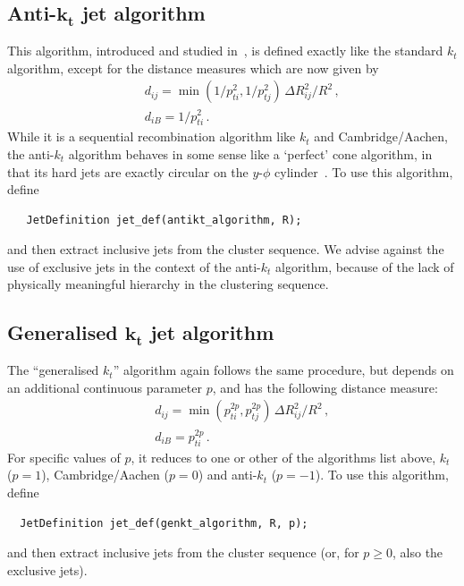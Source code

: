 \documentclass[12pt,a4]{article}
\begin{document}
\subsection[Anti-$k_t$ jet algorithm]{Anti-$\boldsymbol{k_t}$ jet algorithm}
This algorithm, introduced and studied in~\cite{antikt}, is defined
exactly like the standard $k_t$ algorithm, except for the distance
measures which are now given by
\begin{subequations}
    \label{eq:dij_antikt}
  \begin{eqnarray}
    &&d_{ij} = \min(1/p_{ti}^2,1/{p_{tj}^2}) \, \Delta R_{ij}^2 / R^2 \, , \\
    &&d_{iB} = 1/p_{ti}^2 \, .
  \end{eqnarray}
\end{subequations}
While it is a sequential recombination algorithm like $k_t$ and
Cambridge/Aachen, the anti-$k_t$ algorithm behaves in some sense like a
`perfect' cone algorithm, in that its hard jets are exactly
circular on the $y$-$\phi$ cylinder~\cite{antikt}.
%
To use this algorithm, define 
\begin{lstlisting}
   JetDefinition jet_def(antikt_algorithm, R);
\end{lstlisting}
and then extract inclusive jets from the cluster sequence.
%
We advise against the use of exclusive jets in the context of the
anti-$k_t$ algorithm, because of the lack of physically meaningful
hierarchy in the clustering sequence.

\subsection[Generalised-$k_t$ jet algorithm]{Generalised $\boldsymbol{k_t}$ jet algorithm}
\label{sec:genkt}

The ``generalised $k_t$'' algorithm again follows the same procedure,
but depends on an additional continuous parameter $p$, and has the
following distance measure:
\begin{subequations}
  \label{eq:dij_genkt}
  \begin{eqnarray}
    &&d_{ij} = \min(p_{ti}^{2p},p_{tj}^{2p}) \, \Delta R_{ij}^2 / R^2 \, , \\
    &&d_{iB} = p_{ti}^{2p} \, .
  \end{eqnarray}
\end{subequations}
For specific values of $p$, it reduces to one or other of the
algorithms list above, $k_t$ ($p=1$), Cambridge/Aachen ($p=0$) and
anti-$k_t$ ($p=-1$). 
%
To use this algorithm, define 
\begin{lstlisting}
  JetDefinition jet_def(genkt_algorithm, R, p);
\end{lstlisting}
and then extract inclusive jets from the cluster sequence (or, for
$p\ge 0$, also the exclusive jets).
\end{document}
